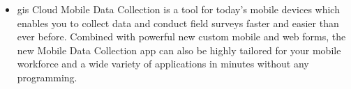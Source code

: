 \begin{itemize}
  \item \gls{gis} Cloud Mobile Data Collection is a tool for today’s mobile devices which enables you to collect data and conduct field surveys faster and easier than ever before. Combined with powerful new custom mobile and web forms, the new Mobile Data Collection app can also be highly tailored for your mobile workforce and a wide variety of applications in minutes without any programming. \cite{GIS_cloud_mobile_data_collection}
  
  
  

\end{itemize}
